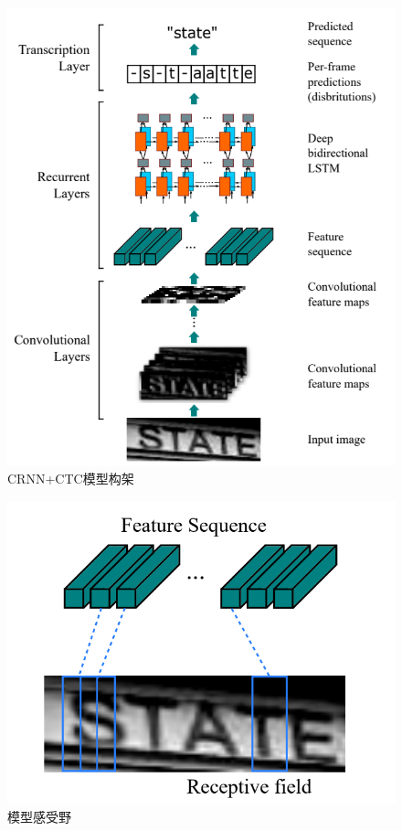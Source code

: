 \documentclass[12pt,a4paper]{ctexart}
\begin{document}
\begin{figure}[H]
	\centering
	\includegraphics[width=0.7\linewidth]{images/crnn_ctc}
	\caption{CRNN+CTC模型构架}
	\label{fig:crnn_ctc}
\end{figure}
\begin{figure}[H]
	\centering
	\includegraphics[width=0.5\linewidth]{images/receptive_field}
	\caption{模型感受野}
	\label{fig:receptive_field}
\end{figure}
\end{document}
